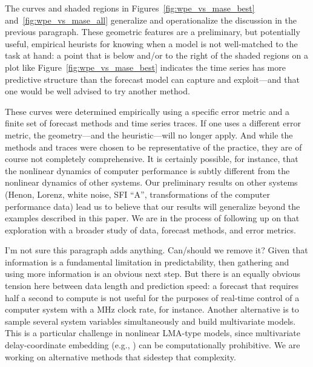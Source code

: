 The curves and shaded regions in Figures~\ref{fig:wpe_vs_mase_best}
and~\ref{fig:wpe_vs_mase_all} generalize and operationalize the
discussion in the previous paragraph.  These geometric features are a
preliminary, but potentially useful, empirical heurists for knowing
when a model is not well-matched to the task at hand: a point that is
below and/or to the right of the shaded regions on a plot like
Figure~\ref{fig:wpe_vs_mase_best} indicates the time series has more
predictive structure than the forecast model can capture and
exploit---and that one would be well advised to try another method.

These curves were determined empirically using a specific error metric
and a finite set of forecast methods and time series traces.  If one
uses a different error metric, the geometry---and the heuristic---will
no longer apply.  And while the methods and traces were chosen to be
representative of the practice, they are of course not completely
comprehensive.  It is certainly possible, for instance, that the
nonlinear dynamics of computer performance is subtly different from
the nonlinear dynamics of other systems.  Our preliminary results on
other systems (Henon, Lorenz, white noise, SFI ``A'', transformations
of the computer performance data) lead us to believe that our results
will generalize beyond the examples described in this paper.  We are
in the process of following up on that exploration with a broader
study of data, forecast methods, and error metrics.

\alert{I'm not sure this paragraph adds anything.  Can/should we
  remove it?  Given that information is a fundamental limitation in
  predictability, then gathering and using more information is an
  obvious next step.  But there is an equally obvious tension here
  between data length and prediction speed: a forecast that requires
  half a second to compute is not useful for the purposes of real-time
  control of a computer system with a MHz clock rate, for instance.
  Another alternative is to sample several system variables
  simultaneously and build multivariate models.  This is a particular
  challenge in nonlinear LMA-type models, since multivariate
  delay-coordinate embedding (e.g.,
  \cite{cao-multivariate-embedding,deyle-sugihara2011}) can be
  computationally prohibitive.  We are working on alternative methods
  that sidestep that complexity.}


